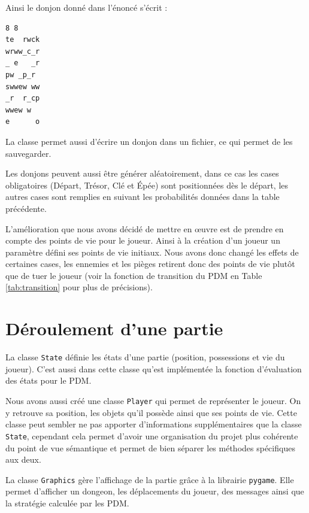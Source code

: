 \documentclass[a4paper]{article}
\theoremstyle{plain}
\begin{document}
Ainsi le donjon donné dans l'énoncé s'écrit :
\begin{center}
\begin{BVerbatim}
8 8
te  rwck
wrww_c_r
_ e   _r
pw _p_r 
swwew ww
_r  r_cp
wwew w  
e      o
\end{BVerbatim}
\end{center}

La classe permet aussi d'écrire un donjon dans un fichier, ce qui permet de les sauvegarder.

Les donjons peuvent aussi être générer aléatoirement, dans ce cas les cases obligatoires (Départ, Trésor, Clé et Épée) sont positionnées dès le départ, les autres cases sont remplies en suivant les probabilités données dans la table précédente.

L'amélioration que nous avons décidé de mettre en \oe uvre est de prendre en compte des points de vie pour le joueur. Ainsi à la création d'un joueur un paramètre défini ses points de vie initiaux. Nous avons donc changé les effets de certaines cases, les ennemies et les pièges retirent donc des points de vie plutôt que de tuer le joueur (voir la fonction de transition du PDM en Table \ref{tab:transition} pour plus de précisions).

\section{Déroulement d'une partie}

La classe \texttt{State} définie les états d'une partie (position, possessions et vie du joueur). C'est aussi dans cette classe qu'est implémentée la fonction d'évaluation des états pour le PDM.

Nous avons aussi créé une classe \texttt{Player} qui permet de représenter le joueur. On y retrouve sa position, les objets qu'il possède ainsi que ses points de vie. Cette classe peut sembler ne pas apporter d'informations supplémentaires que la classe \texttt{State}, cependant cela permet d'avoir une organisation du projet plus cohérente du point de vue sémantique et permet de bien séparer les méthodes spécifiques aux deux.

La classe \texttt{Graphics} gère l'affichage de la partie grâce à la librairie \texttt{pygame}. Elle permet d'afficher un dongeon, les déplacements du joueur, des messages ainsi que la stratégie calculée par les PDM. \\
\end{document}
